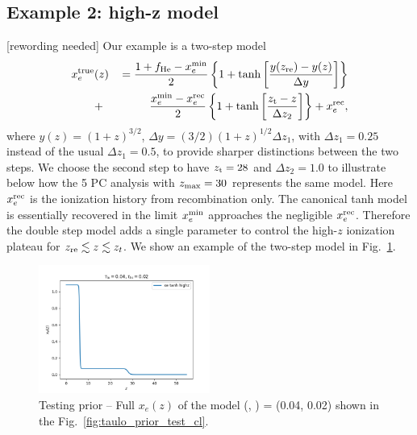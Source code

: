 \documentclass[prd,twocolumn,amsmath,amssymb,floatfix,superscriptaddress,nofootinbib]{revtex4-1}
\newcommand{\zmax}{z_{\rm max}}
\newcommand{\xemin}{x_e^{\rm min}}
\newcommand{\bea}{\begin{eqnarray}}
\newcommand{\eea}{\end{eqnarray}}
\begin{document}
\subsection{Example 2: high-z model}
\label{sec:example2}
[rewording needed]
Our example is a two-step model 
 \bea
x_e^{\rm true}&(z)&\,= \frac{1+f_{\rm He} - \xemin}{2}\left\{  1+ \tanh\left[ \frac{y(z_{\rm re})-y(z)}{\Delta y} \right] \right\} \notag \\
&+& \frac{\xemin - x_e^{\rm rec}}{2}\left\{  1+ \tanh\left[ \frac{z_{\rm t}-z}{\Delta z_{2}} \right] \right\} + x_e^{\rm rec},
 \label{eqn:tanh_highz}
 \eea
where $y(z)=(1+z)^{3/2}$, $\Delta y=(3/2)(1+z)^{1/2}\Delta z_1$, with $\Delta z_1 = 0.25$ instead of the usual $\Delta z_1 = 0.5$,
to provide sharper distinctions between the two steps.
We choose the second step to have $z_{\rm t}=28$  and  $\Delta z_2 = 1.0$  to illustrate below
how the 5 PC analysis with $\zmax=30$ represents the same model.  Here $x_e^{\rm rec}$ is the ionization history from recombination only.
The canonical tanh model is essentially recovered in the limit $\xemin$ approaches the negligible $x_e^{\rm rec}$.  Therefore the double
step model adds a single parameter to control the high-$z$ ionization plateau for $z_{\rm re} \lesssim z \lesssim z_t$.   We show an example
of the two-step model in Fig.~\ref{fig:two_step_model}.


\begin{figure}
\includegraphics[width=0.5\textwidth]{results/cosmomc_kde/taulo_prior_test/plot_xez_taulo_0p04_tauhi_0p02.png}
\caption{Testing \taulo prior -- Full $x_e(z)$ of the model (\taulo, \tauhi) = (0.04, 0.02) shown in the Fig.~\ref{fig:taulo_prior_test_cl}. 
}
\label{fig:two_step_model}
\end{figure}
\end{document}
